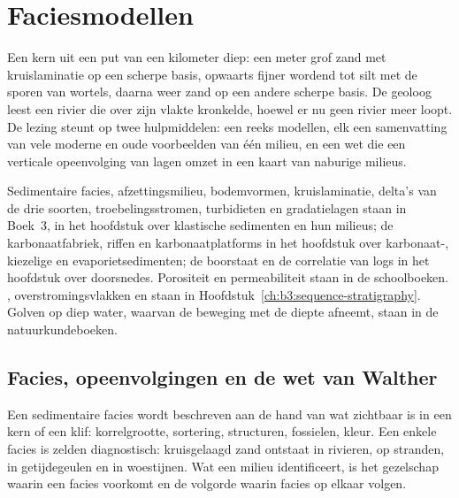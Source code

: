 \chapter{Faciesmodellen}\label{ch:b3:facies-models}

Een kern uit een put van een kilometer diep: een meter grof zand met
kruislaminatie op een scherpe basis, opwaarts fijner wordend tot silt met de
sporen van wortels, daarna weer zand op een andere scherpe basis. De geoloog leest een rivier
die over zijn vlakte kronkelde, hoewel er nu geen rivier meer loopt. De lezing
steunt op twee hulpmiddelen: een reeks modellen, elk een samenvatting van vele moderne en
oude voorbeelden van één milieu, en een wet die een verticale
opeenvolging van lagen omzet in een kaart van naburige milieus.

\begin{recall}
Sedimentaire facies, afzettingsmilieu, bodemvormen, kruislaminatie,
delta's van de drie soorten, troebelingsstromen, turbidieten en gradatielagen
staan in Boek~3, in het hoofdstuk over klastische sedimenten en hun
milieus; de karbonaatfabriek, riffen en karbonaatplatforms in het
hoofdstuk over karbonaat-, kiezelige en evaporietsedimenten; de boorstaat en
de correlatie van logs in het hoofdstuk over doorsnedes. Porositeit en
permeabiliteit staan in de schoolboeken. , overstromingsvlakken en
 staan in Hoofdstuk~\ref{ch:b3:sequence-stratigraphy}. Golven op
diep water, waarvan de beweging met de diepte afneemt, staan in de natuurkundeboeken.
\end{recall}

\section{Facies, opeenvolgingen en de wet van Walther}\label{sec:b3:facies-models:walther}

Een sedimentaire facies wordt beschreven aan de hand van wat zichtbaar is in
een kern of een klif: korrelgrootte, sortering, structuren, fossielen, kleur. Een enkele facies is
zelden diagnostisch: kruisgelaagd zand ontstaat in rivieren, op stranden, in
getijdegeulen en in woestijnen. Wat een milieu identificeert, is het gezelschap waarin een
facies voorkomt en de volgorde waarin facies op elkaar volgen.

